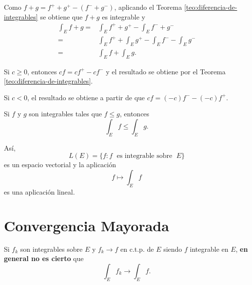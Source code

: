                     \begin{demo}
                     Como $f+g=f^+ + g^+ -(f^-+g^-)$, aplicando el Teorema \ref{teo:diferencia-de-integrables} se obtiene que $f+g$ es integrable y         \[
                     \begin{split}
                     \int_E f+g =&\int_E f^{+} +g^{+}  - \int_E f^{-} + g^{-}
                     \\
                     =&\int_E f^{+} +\int_E g^{+}  - \int_E f^{-} -\int_E g^{-}
                     \\
                     =&\int_E f + \int_E g.
                     \end{split}
                     \]
                     
                     Si $c\geq 0$, entonces $cf=cf^{+}-cf^{-}$ y el resultado se obtiene por el Teorema \ref{teo:diferencia-de-integrables}.
                     
                     Si $c<0$, el resultado se obtiene a partir de que $cf=(-c)f^{-}-(-c)f^{+}$.
                    \end{demo}
                    
                    \begin{corolario}{}
                    Si $f$ y $g$ son integrables tales que $f\leq g$, entonces 
                    \[\int_E f \leq \int_E g.\]
                    \end{corolario}
                    
                    
                    As\'i, 
                    \[
                    L(E)=\{
                    f: f\;\mbox{ es integrable sobre }\;E
                    \}
                    \]
                    es un espacio vectorial y la aplicaci\'on
                    \[
                    f \longmapsto \int_E f
                    \]
                    es una aplicaci\'on lineal.
                    
                    \section{Convergencia Mayorada}
                    
                    
                    Si $f_k$ son integrables sobre $E$ y $f_k \to f$ en c.t.p. de $E$ siendo $f$  integrable en $E$, \textbf{en general no es cierto} que 
                    \[
                    \int_E f_k \to \int_E f.
                    \]
                    
